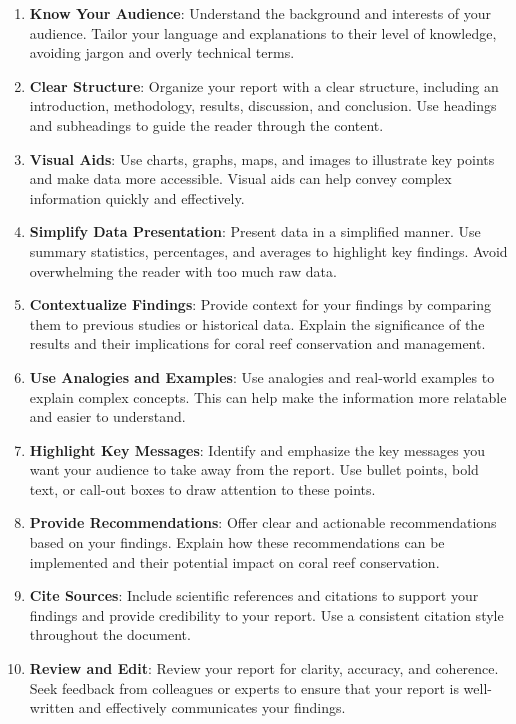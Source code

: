\documentclass[
  letterpaper,
  DIV=11,
  numbers=noendperiod]{scrartcl}
\begin{document}
\begin{enumerate}
\def\labelenumi{\arabic{enumi}.}
\item
  \textbf{Know Your Audience}: Understand the background and interests
  of your audience. Tailor your language and explanations to their level
  of knowledge, avoiding jargon and overly technical terms.
\item
  \textbf{Clear Structure}: Organize your report with a clear structure,
  including an introduction, methodology, results, discussion, and
  conclusion. Use headings and subheadings to guide the reader through
  the content.
\item
  \textbf{Visual Aids}: Use charts, graphs, maps, and images to
  illustrate key points and make data more accessible. Visual aids can
  help convey complex information quickly and effectively.
\item
  \textbf{Simplify Data Presentation}: Present data in a simplified
  manner. Use summary statistics, percentages, and averages to highlight
  key findings. Avoid overwhelming the reader with too much raw data.
\item
  \textbf{Contextualize Findings}: Provide context for your findings by
  comparing them to previous studies or historical data. Explain the
  significance of the results and their implications for coral reef
  conservation and management.
\item
  \textbf{Use Analogies and Examples}: Use analogies and real-world
  examples to explain complex concepts. This can help make the
  information more relatable and easier to understand.
\item
  \textbf{Highlight Key Messages}: Identify and emphasize the key
  messages you want your audience to take away from the report. Use
  bullet points, bold text, or call-out boxes to draw attention to these
  points.
\item
  \textbf{Provide Recommendations}: Offer clear and actionable
  recommendations based on your findings. Explain how these
  recommendations can be implemented and their potential impact on coral
  reef conservation.
\item
  \textbf{Cite Sources}: Include scientific references and citations to
  support your findings and provide credibility to your report. Use a
  consistent citation style throughout the document.
\item
  \textbf{Review and Edit}: Review your report for clarity, accuracy,
  and coherence. Seek feedback from colleagues or experts to ensure that
  your report is well-written and effectively communicates your
  findings.
\end{enumerate}
\end{document}
